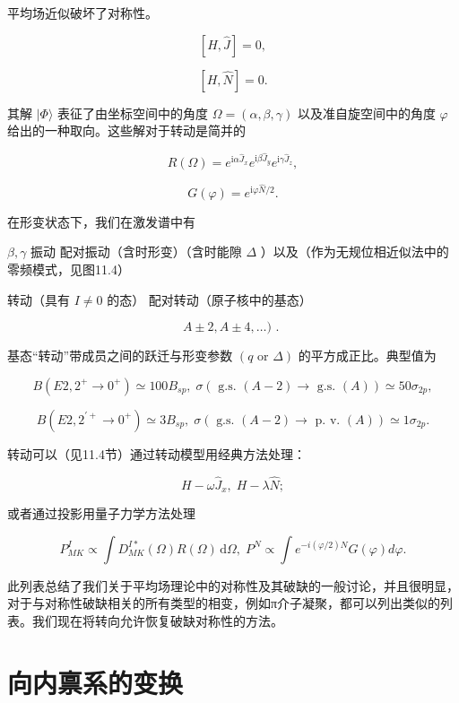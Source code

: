 平均场近似破坏了对称性。

\[
\left\lbrack {H,\widehat{J}}\right\rbrack =0,
\]

\[
\left\lbrack {H,\widehat{N}}\right\rbrack =0.
\]

其解 $|\Phi\rangle$ 表征了由坐标空间中的角度 $\Omega=\left({\alpha,\beta,\gamma}\right)$
以及准自旋空间中的角度 $\varphi$ 给出的一种取向。这些解对于转动是简并的

\[
R\left(\Omega\right)={e}^{{\mathrm{i}\alpha}{\widehat{J}}_{x}}{e}^{{\mathrm{i}\beta}{\widehat{J}}_{y}}{e}^{{\mathrm{i}\gamma}{\widehat{J}}_{z}},
\]

\[
G\left(\varphi\right)={e}^{{\mathrm{i}\varphi}\widehat{N}/2}.
\]

在形变状态下，我们在激发谱中有

$\beta,\gamma$ 振动 配对振动（含时形变）（含时能隙 $\Delta$ ）以及（作为无规位相近似法中的零频模式，见图11.4）

转动（具有 $I\neq0$ 的态） 配对转动（原子核中的基态）

\[
A\pm2,A\pm4,\ldots)\text{ . }
\]

基态“转动”带成员之间的跃迁与形变参数 $\left({q\text{ or }\Delta}\right)$ 的平方成正比。典型值为

\[
B\left({{E2},{2}^{+}\rightarrow{0}^{+}}\right)\simeq{100}{B}_{sp},\;\sigma\left({\text{ g.s. }\left({A-2}\right)\rightarrow\text{ g.s. }\left(A\right)}\right)\simeq{50}{\sigma}_{2p},
\]

\[
B\left({{E2},{2}^{\prime+}\rightarrow{0}^{+}}\right)\simeq3{B}_{sp},\;\sigma\left({\text{ g.s. }\left({A-2}\right)\rightarrow\text{ p. v. }\left(A\right)}\right)\simeq1{\sigma}_{2p}.
\]

转动可以（见11.4节）通过转动模型用经典方法处理：

\[
H-\omega{\widehat{J}}_{x},\;H-\lambda\widehat{N};
\]

或者通过投影用量子力学方法处理

\[
{P}^{I}_{MK}\propto\int{D}^{I*}_{MK}\left(\Omega\right)R\left(\Omega\right){\,\mathrm{d}\Omega},\;{P}^{N}\propto\int{e}^{-i\left({\varphi/2}\right)N}G\left(\varphi\right){d\varphi}.
\]

此列表总结了我们关于平均场理论中的对称性及其破缺的一般讨论，并且很明显，对于与对称性破缺相关的所有类型的相变，例如π介子凝聚，都可以列出类似的列表。我们现在将转向允许恢复破缺对称性的方法。

\section{向内禀系的变换\label{sec:=005411=005185=007980=007CFB=007684=0053D8=006362}}

